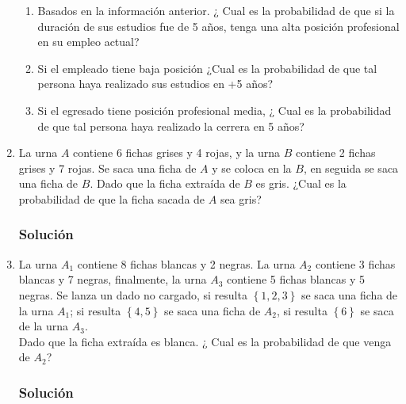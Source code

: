 \begin{enumerate}
\begin{center}
\end{center}
\begin{enumerate}
\item Basados en la información anterior.  ¿ Cual es la probabilidad de que si la duración de sus estudios fue de 5 años, tenga una alta posición profesional en su empleo actual?
\item Si el empleado tiene baja posición ¿Cual es la probabilidad de que tal persona haya realizado sus estudios en +5 años?
\item Si el egresado tiene posición profesional media, ¿ Cual es la probabilidad de que tal persona haya realizado la cerrera en 5 años?
\end{enumerate}
\item La urna $A$ contiene 6 fichas grises y 4 rojas, y la urna $B$ contiene 2 fichas grises y 7 rojas. Se saca una ficha de $A$ y se coloca en la $B$, en seguida se saca una ficha de $B$. Dado que la ficha extraída de $B$ es gris. ¿Cual es la probabilidad de que la ficha sacada de $A$ sea gris?
\subsubsection{Solución}
\item La urna $A_1$ contiene 8 fichas blancas y 2 negras. La urna $A_2$ contiene 3 fichas blancas y 7 negras, finalmente, la urna $A_3$ contiene 5 fichas blancas y 5 negras. Se lanza un dado no cargado, si resulta $\left\lbrace 1,2,3\right\rbrace $ se saca una ficha de la urna $A_1$; si resulta $\left\lbrace 4,5 \right\rbrace $ se saca una ficha de $A_2$, si resulta $\left\lbrace 6 \right\rbrace $ se saca de la urna $A_3$. \\${ }$\\ Dado que la ficha extraída es blanca. ¿ Cual es la probabilidad de que venga de $A_2$?
\subsubsection{Solución}
\end{enumerate}
